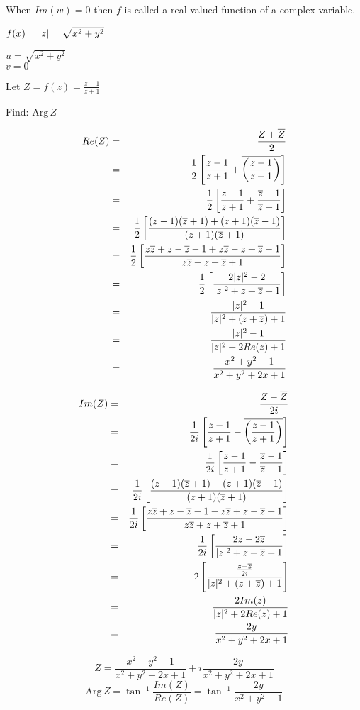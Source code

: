 \documentclass[letterpaper,12pt,fleqn]{article}
\newcommand{\Arg}[1]{\mathrm{Arg}\,#1}
\newcommand{\conj}[1]{\overline{#1}}
\begin{document}
When $Im(w)=0$ then $f$ is called a real-valued function of a complex variable.

\begin{example}
  $f(x)=\lvert z\rvert=\sqrt{x^2+y^2}$

  $u=\sqrt{x^2+y^2}$ \\
  $v=0$
\end{example}
\newpage
\begin{example}
  Let $Z=f(z)=\frac{z-1}{z+1}$

  Find: $\Arg{Z}$

  \begin{eqnarray*}
    Re(Z) &=& \frac{Z+\conj{Z}}{2} \\
    &=& \frac{1}{2}\left[\frac{z-1}{z+1}+
      \conj{\left(\frac{z-1}{z+1}\right)}\right] \\
    &=& \frac{1}{2}\left[\frac{z-1}{z+1}+
      \frac{\conj{z}-1}{\conj{z}+1}\right] \\
    &=& \frac{1}{2}\left[\frac{(z-1)(\conj{z}+1)+(z+1)(\conj{z}-1)}
      {(z+1)(\conj{z}+1)}\right] \\
    &=& \frac{1}{2}\left[\frac{z\conj{z}+z-\conj{z}-1+z\conj{z}-z+\conj{z}-1}
      {z\conj{z}+z+\conj{z}+1}\right] \\
    &=& \frac{1}{2}\left[\frac{2\abs{z}^2-2}{\abs{z}^2+z+\conj{z}+1}\right] \\
    &=& \frac{\abs{z}^2-1}{\abs{z}^2+(z+\conj{z})+1} \\
    &=& \frac{\abs{z}^2-1}{\abs{z}^2+2Re(z)+1} \\
    &=& \frac{x^2+y^2-1}{x^2+y^2+2x+1} \\
  \end{eqnarray*}

  \begin{eqnarray*}
    Im(Z) &=& \frac{Z-\conj{Z}}{2i} \\
    &=& \frac{1}{2i}\left[\frac{z-1}{z+1}-
      \conj{\left(\frac{z-1}{z+1}\right)}\right] \\
    &=& \frac{1}{2i}\left[\frac{z-1}{z+1}-
      \frac{\conj{z}-1}{\conj{z}+1}\right] \\
    &=& \frac{1}{2i}\left[\frac{(z-1)(\conj{z}+1)-(z+1)(\conj{z}-1)}
      {(z+1)(\conj{z}+1)}\right] \\
    &=& \frac{1}{2i}\left[\frac{z\conj{z}+z-\conj{z}-1-z\conj{z}+z-\conj{z}+1}
      {z\conj{z}+z+\conj{z}+1}\right] \\
    &=& \frac{1}{2i}\left[\frac{2z-2\conj{z}}{\abs{z}^2+z+\conj{z}+1}\right] \\
    &=& 2\left[\frac{\frac{z-\conj{z}}{2i}}{\abs{z}^2+(z+\conj{z})+1}\right] \\
    &=& \frac{2Im(z)}{\abs{z}^2+2Re(z)+1} \\
    &=& \frac{2y}{x^2+y^2+2x+1} \\
  \end{eqnarray*}

  \[Z=\frac{x^2+y^2-1}{x^2+y^2+2x+1}+i\frac{2y}{x^2+y^2+2x+1}\]
  \[\Arg{Z}=\tan^{-1}\frac{Im(Z)}{Re(Z)}=\tan^{-1}\frac{2y}{x^2+y^2-1}\]
\end{example}
\end{document}

